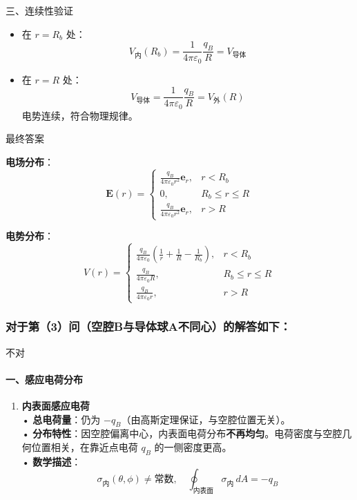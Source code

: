 \documentclass{article}
\begin{document}
{三、连续性验证

\begin{itemize}
    \item 在 \(r = R_b\) 处：  
    \[
    V_\text{内}(R_b) = \frac{1}{4\pi\varepsilon_0} \frac{q_B}{R} = V_\text{导体}
    \]
    \item 在 \(r = R\) 处：  
    \[
    V_\text{导体} = \frac{1}{4\pi\varepsilon_0} \frac{q_B}{R} = V_\text{外}(R)
    \]
    电势连续，符合物理规律。
\end{itemize}



最终答案

\textbf{电场分布}：
\[
\boxed{
\mathbf{E}(r) = 
\begin{cases}
\displaystyle \frac{q_B}{4\pi\varepsilon_0 r^2} \mathbf{e}_r, & r < R_b \\
0, & R_b \leq r \leq R \\
\displaystyle \frac{q_B}{4\pi\varepsilon_0 r^2} \mathbf{e}_r, & r > R
\end{cases}
}
\]

\textbf{电势分布}：
\[
\boxed{
V(r) = 
\begin{cases}
\displaystyle \frac{q_B}{4\pi\varepsilon_0} \left( \frac{1}{r} + \frac{1}{R} - \frac{1}{R_b} \right), & r < R_b \\
\displaystyle \frac{q_B}{4\pi\varepsilon_0 R}, & R_b \leq r \leq R \\
\displaystyle \frac{q_B}{4\pi\varepsilon_0 r}, & r > R
\end{cases}
}
\]

\subsubsection*{对于第（3）问（空腔B与导体球A不同心）的解答如下：}

{\color{red}不对}
\paragraph*{一、感应电荷分布}


\begin{enumerate}
    \item \textbf{内表面感应电荷}  \\
    • \textbf{总电荷量}：仍为 \(-q_B\)（由高斯定理保证，与空腔位置无关）。  \\
    • \textbf{分布特性}：因空腔偏离中心，内表面电荷分布\textbf{不再均匀}。电荷密度与空腔几何位置相关，在靠近点电荷 \(q_B\) 的一侧密度更高。  \\
    • \textbf{数学描述}：  \\
    \[
    \sigma_{\text{内}}(\theta, \phi) \neq \text{常数}, \quad \oint_{\text{内表面}} \sigma_{\text{内}} \, dA = -q_B
    \]


\end{enumerate}}
\end{document}
